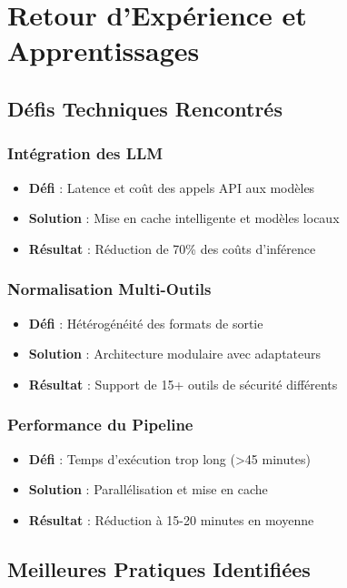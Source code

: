 \documentclass[12pt,a4paper]{report}
\begin{document}
\section{Retour d'Expérience et Apprentissages}

\subsection{Défis Techniques Rencontrés}

\subsubsection{Intégration des LLM}
\begin{itemize}
    \item \textbf{Défi} : Latence et coût des appels API aux modèles
    \item \textbf{Solution} : Mise en cache intelligente et modèles locaux
    \item \textbf{Résultat} : Réduction de 70\% des coûts d'inférence
\end{itemize}

\subsubsection{Normalisation Multi-Outils}
\begin{itemize}
    \item \textbf{Défi} : Hétérogénéité des formats de sortie
    \item \textbf{Solution} : Architecture modulaire avec adaptateurs
    \item \textbf{Résultat} : Support de 15+ outils de sécurité différents
\end{itemize}

\subsubsection{Performance du Pipeline}
\begin{itemize}
    \item \textbf{Défi} : Temps d'exécution trop long (>45 minutes)
    \item \textbf{Solution} : Parallélisation et mise en cache
    \item \textbf{Résultat} : Réduction à 15-20 minutes en moyenne
\end{itemize}

\subsection{Meilleures Pratiques Identifiées}
\end{document}
